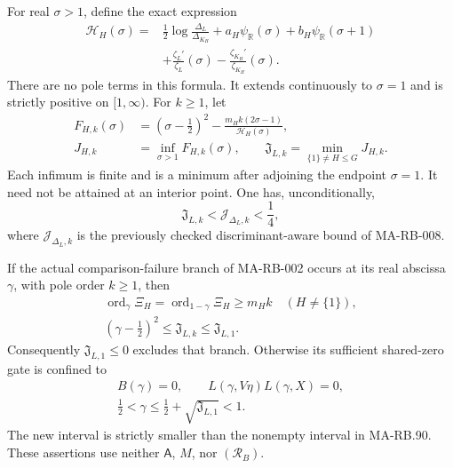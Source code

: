 For real \(\sigma>1\), define the exact expression
\[
 \begin{split}
 \mathscr H_H(\sigma)
   ={}&\frac12\log\frac{\Delta_L}{\Delta_{K_H}}
       +a_H\psi_{\mathbb R}(\sigma)
       +b_H\psi_{\mathbb R}(\sigma+1)\\
      &+\frac{\zeta_L'}{\zeta_L}(\sigma)
       -\frac{\zeta_{K_H}'}{\zeta_{K_H}}(\sigma).
 \end{split}
 \tag{MA-RB.172}
\]
There are no pole terms in this formula. It extends
continuously to \(\sigma=1\) and is strictly positive
on \([1,\infty)\). For \(k\ge1\), let
\[
 \begin{split}
 F_{H,k}(\sigma)
    &=(\sigma-\tfrac12)^2
        -\frac{m_Hk(2\sigma-1)}{\mathscr H_H(\sigma)},\\
 J_{H,k}&=\inf_{\sigma>1}F_{H,k}(\sigma),\qquad
 \mathfrak J_{L,k}
      =\min_{\{1\}\ne H\le G}J_{H,k}.
 \end{split}
 \tag{MA-RB.173}
\]
Each infimum is finite and is a minimum after adjoining
the endpoint \(\sigma=1\). It need not be attained at
an interior point. One has, unconditionally,
\[
          \mathfrak J_{L,k}
                 <\mathcal J_{\Delta_L,k}<\frac14,
 \tag{MA-RB.174}
\]
where \(\mathcal J_{\Delta_L,k}\) is the previously
checked discriminant-aware bound of MA-RB-008.

If the actual comparison-failure branch of MA-RB-002
occurs at its real abscissa \(\gamma\), with pole order
\(k\ge1\), then
\[
 \begin{gathered}
 \operatorname{ord}_{\gamma}\Xi_H
   =\operatorname{ord}_{1-\gamma}\Xi_H\ge m_Hk
                                      \quad(H\ne\{1\}),\\
             (\gamma-\tfrac12)^2\le\mathfrak J_{L,k}
                                      \le\mathfrak J_{L,1}.
 \end{gathered}
 \tag{MA-RB.175}
\]
Consequently \(\mathfrak J_{L,1}\le0\) excludes that
branch. Otherwise its sufficient shared-zero gate
is confined to
\[
 \begin{gathered}
 B(\gamma)=0,\qquad
        L(\gamma,V\eta)L(\gamma,X)=0,\\
 \frac12<\gamma
       \le\frac12+\sqrt{\mathfrak J_{L,1}}<1.
 \end{gathered}
 \tag{MA-RB.176}
\]
The new interval is strictly smaller than the nonempty
interval in MA-RB.90. These assertions use neither
\(\mathsf A\), \(M\), nor \((\mathcal R_B)\).

